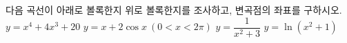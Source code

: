 다음 곡선이 아래로 볼록한지 위로 볼록한지를 조사하고, 변곡점의 좌표를 구하시오.
 $y=x^4+4x^3+20$
 $y=x+2\cos x\ (0<x<2\pi)$
 $y=\dfrac{1}{x^2+3}$
 $y=\ln(x^2+1)$
